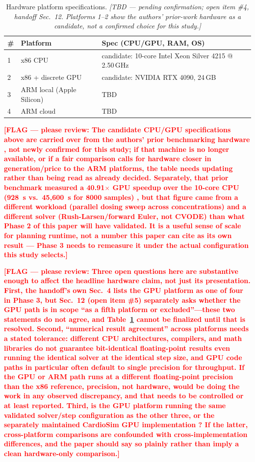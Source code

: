 \documentclass[journal]{IEEEtran}
\newcommand{\flag}[1]{\textcolor{red}{\textbf{[FLAG --- please review: #1]}}}
\begin{document}
\begin{table}[!t]
\centering
\caption{Hardware platform specifications. \emph{[TBD --- pending confirmation; open item \#4, handoff Sec.~12. Platforms 1--2 show the authors' prior-work hardware \cite{pramawijaya2024thesis} as a candidate, not a confirmed choice for this study.]}}
\label{tab:hardware}
\begin{tabular}{@{}lll@{}}
\toprule
\# & Platform & Spec (CPU/GPU, RAM, OS) \\
\midrule
1 & x86 CPU & candidate: 10-core Intel Xeon Silver 4215 @ 2.50\,GHz \\
2 & x86 + discrete GPU & candidate: NVIDIA RTX 4090, 24\,GB \\
3 & ARM local (Apple Silicon) & TBD \\
4 & ARM cloud & TBD \\
\bottomrule
\end{tabular}
\end{table}

\flag{The candidate CPU/GPU specifications above are carried over from the authors' prior benchmarking hardware \cite{pramawijaya2024thesis}, not newly confirmed for this study; if that machine is no longer available, or if a fair comparison calls for hardware closer in generation/price to the ARM platforms, the table needs updating rather than being read as already decided. Separately, that prior benchmark measured a 40.91$\times$ GPU speedup over the 10-core CPU (928~s vs.\ 45{,}600~s for 8000 samples) \cite{pramawijaya2024thesis}, but that figure came from a different workload (parallel dosing sweep across concentrations) and a different solver (Rush-Larsen/forward Euler, not CVODE) than what Phase 2 of this paper will have validated. It is a useful sense of scale for planning runtime, not a number this paper can cite as its own result --- Phase 3 needs to remeasure it under the actual configuration this study selects.}

\flag{Three open questions here are substantive enough to affect the headline hardware claim, not just its presentation. First, the handoff's own Sec.~4 lists the GPU platform as one of four in Phase 3, but Sec.~12 (open item \#5) separately asks whether the GPU path is in scope ``as a fifth platform or excluded''---these two statements do not agree, and Table~\ref{tab:hardware} cannot be finalized until that is resolved. Second, ``numerical result agreement'' across platforms needs a stated tolerance: different CPU architectures, compilers, and math libraries do not guarantee bit-identical floating-point results even running the identical solver at the identical step size, and GPU code paths in particular often default to single precision for throughput. If the GPU or ARM path runs at a different floating-point precision than the x86 reference, precision, not hardware, would be doing the work in any observed discrepancy, and that needs to be controlled or at least reported. Third, is the GPU platform running the same validated solver/step configuration as the other three, or the separately maintained CardioSim GPU implementation \cite{aroli2024}? If the latter, cross-platform comparisons are confounded with cross-implementation differences, and the paper should say so plainly rather than imply a clean hardware-only comparison.}
\end{document}
